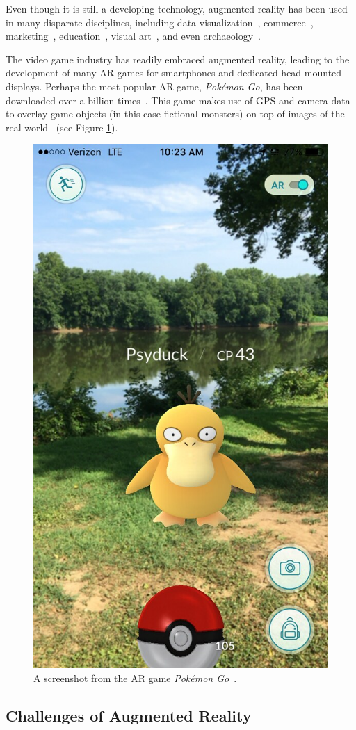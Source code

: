 \documentclass[a4paper, 10pt, american, titlepage]{article}
\begin{document}
Even though it is still a developing technology, augmented reality has been used
in many disparate disciplines, including data
visualization~\autocite{resnick2017}, commerce~\autocite{matney2018},
marketing~\autocite{sharma2015}, education~\autocite{stewart-smith2012}, visual
art~\autocite{katz2018}, and even archaeology~\autocite{eve2012}.

The video game industry has readily embraced augmented reality, leading to the
development of many AR games for smartphones and dedicated head-mounted
displays. Perhaps the most popular AR game, \textit{Pokémon Go}, has been
downloaded over a billion times~\autocite{webster2018}. This game makes use of
GPS and camera data to overlay game objects (in this case fictional monsters) on
top of images of the real world~\autocite{concepcion2016} (see Figure
\ref{fig:pokemonGo}).

\begin{figure}[h]
	\centering
	\includegraphics[width=.5\textwidth]{pokemon-go.jpg}
	\caption[A screenshot from the AR game \textit{Pokémon Go}]{A screenshot
		from the AR game \textit{Pokémon Go}~\autocite{vastateparks2016}.}
	\label{fig:pokemonGo}
\end{figure}

\subsection{Challenges of Augmented Reality}
\label{sec:challengesOfAugmentedReality}
\end{document}
